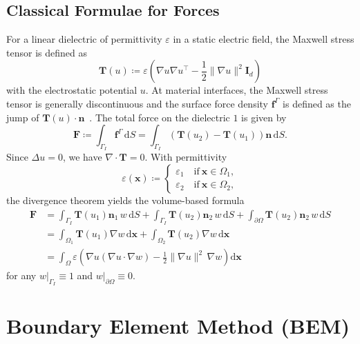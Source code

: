 \documentclass{article}
\theoremstyle{remark}
\newcommand{\x}{\boldsymbol{x}}
\newcommand{\dd}{\mathrm{d}}
\newcommand{\n}{\boldsymbol{n}}
\newcommand{\mat}[1]{\mathbf{#1}}
\begin{document}
\subsection{Classical Formulae for Forces}
For a linear dielectric of permittivity $\varepsilon$ in a static electric field, the Maxwell stress tensor \cite[Section~8.2]{griffiths_2017} is defined as
\begin{equation}
    \mat{T}(u)\coloneqq\varepsilon\left(\nabla u\nabla u^\top - \frac{1}{2}\|\nabla u\|^2\mat{I}_d\right)
\end{equation}
with the electrostatic potential $u$. At material interfaces, the Maxwell stress tensor is generally discontinuous and the surface force density $\mat{f}^{\Gamma}$ is defined as the jump of
$\mat{T}(u)\cdot\n$~\cite{force}. The total force on the dielectric $1$ is given by
\begin{equation}
\label{eq:force}
    \mat{F}\coloneqq\int_{\Gamma_I}\mat{f}^\Gamma\,\dd S
    =\int_{\Gamma_I}\left(\mat{T}(u_2)-\mat{T}(u_1)\right)\n\,\dd S.
\end{equation}
Since $\Delta u=0$, we have $\nabla\cdot\mat{T}=0$. With permittivity
\begin{equation}
    \varepsilon(\x)\coloneqq
    \begin{cases}
		\varepsilon_1\quad\text{if}~\x\in\Omega_1,\\
        \varepsilon_2\quad\text{if}~\x\in\Omega_2,
	\end{cases}
\end{equation}
the divergence theorem yields the volume-based formula
\begin{equation}
\label{eq:vol-formula}
\begin{aligned}
    \mat{F}&=\int_{\Gamma_I}\mat{T}(u_1)\n_1\,w\,\dd S+\int_{\Gamma_I}\mat{T}(u_2)\n_2\,w\,\dd S+\int_{\partial\Omega}\mat{T}(u_2)\n_2\,w\,\dd S\\
    &=\int_{\Omega_1}\mat{T}(u_1)\nabla w\,\dd\x+\int_{\Omega_2}\mat{T}(u_2)\nabla w\,\dd\x\\
    &=\int_{\Omega}\varepsilon\left(\nabla u\left(\nabla u\cdot\nabla w\right)-\frac{1}{2}\|\nabla u\|^2\,\nabla w\right)\dd\x
\end{aligned}
\end{equation}
for any $\left.w\right|_{\Gamma_I}\equiv 1$ and $\left.w\right|_{\partial\Omega}\equiv 0$.

\section{Boundary Element Method (BEM)}
\end{document}
